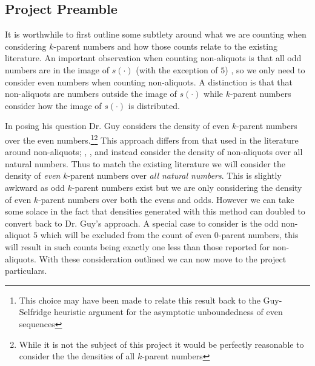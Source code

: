 \documentclass{article}
\theoremstyle{definition}
\begin{document}
\subsection{Project Preamble}
It is worthwhile to first outline some subtlety around what we are counting when considering $k$-parent numbers and how those counts relate to the existing literature. An important observation when counting non-aliquots is that all odd numbers are in the image of $s(\cdot)$ (with the exception of $5$) \cite{pollPom}, so we only need to consider even numbers when counting non-aliquots. A distinction is that that non-aliquots are numbers outside the image of $s(\cdot)$ while $k$-parent numbers consider how the image of $s(\cdot)$ is distributed. 

In posing his question Dr. Guy considers the density of even $k$-parent numbers over the even numbers.\footnote[1]{This choice may have been made to relate this result back to the Guy-Selfridge heuristic argument for the asymptotic unboundedness of even sequences}\footnote[2]{While it is not the subject of this project it would be perfectly reasonable to consider the the densities of all $k$-parent numbers} This approach differs from that used in the literature around non-aliquots; \cite{chum_guy_jacobson_mosunov_2018}, \cite{pollPom}, and \cite{pomYang} instead consider the density of non-aliquots over all natural numbers. Thus to match the existing literature we will consider the density of \textit{even} $k$-parent numbers over \textit{all natural numbers}. This is slightly awkward as odd $k$-parent numbers exist but we are only considering the density of even $k$-parent numbers over both the evens and odds. However we can take some solace in the fact that densities generated with this method can doubled to convert back to Dr. Guy's approach. A special case to consider is the odd non-aliquot $5$ which will be excluded from the count of even $0$-parent numbers, this will result in such counts being exactly one less than those reported for non-aliquots. With these consideration outlined we can now move to the project particulars.
\end{document}
